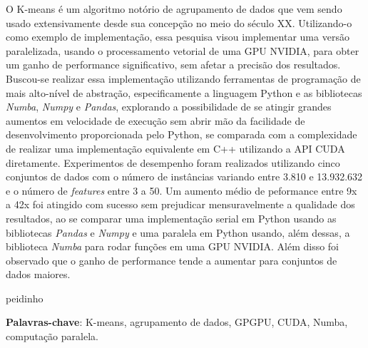 \documentclass[12pt,
openright, 
oneside, %
a4paper,    %
brazil]{facom-ufu-abntex2}
\begin{document}





\begin{resumo}

O K-means é um algoritmo notório de agrupamento de dados que vem sendo usado extensivamente desde sua concepção no meio do século XX. Utilizando-o como exemplo de implementação, essa pesquisa visou implementar uma versão paralelizada, usando o processamento vetorial de uma GPU NVIDIA, para obter um ganho de performance significativo, sem afetar a precisão dos resultados. Buscou-se realizar essa implementação utilizando ferramentas de programação de mais alto-nível de abstração, especificamente a linguagem Python e as bibliotecas \textit{Numba}, \textit{Numpy} e \textit{Pandas}, explorando a possibilidade de se atingir grandes aumentos em velocidade de execução sem abrir mão da facilidade de desenvolvimento proporcionada pelo Python, se comparada com a complexidade de realizar uma implementação equivalente em C++ utilizando a API CUDA diretamente. Experimentos de desempenho foram realizados utilizando cinco conjuntos de dados com o número de instâncias variando entre 3.810 e 13.932.632 e o número de \textit{features} entre 3 a 50. Um aumento médio de peformance entre 9x a 42x foi atingido com sucesso sem prejudicar mensuravelmente a qualidade dos resultados, ao se comparar uma implementação serial em Python usando as bibliotecas \textit{Pandas} e \textit{Numpy} e uma paralela em Python usando, além dessas, a biblioteca \textit{Numba} para rodar funções em uma GPU NVIDIA. Além disso foi observado que o ganho de performance tende a aumentar para conjuntos de dados maiores.

peidinho

\vspace{\onelineskip}
  
\noindent
\textbf{Palavras-chave}: K-means, agrupamento de dados, GPGPU, CUDA, Numba, computação paralela.

\end{resumo}
\end{document}
